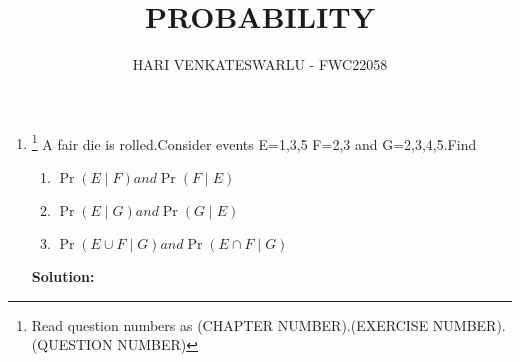 \documentclass{article}
\providecommand{\pr}[1]{\ensuremath{\Pr\left(#1\right)}}
\newcommand{\solution}{\noindent \textbf{Solution: }}
\providecommand{\pr}[1]{\ensuremath{\Pr\left(#1\right)}}
\begin{document}
\title{PROBABILITY}
\author{\Large HARI VENKATESWARLU - FWC22058}
\date{}

\maketitle

\begin{enumerate}[label=13.\arabic{enumi}.\arabic{enumii}]%
\setcounter{enumi}{0}
\setcounter{enumii}{11}

\item \footnote{Read question numbers as (CHAPTER NUMBER).(EXERCISE NUMBER).(QUESTION NUMBER)} {A fair die is rolled.Consider events E=1,3,5 F=2,3 and G=2,3,4,5.Find}
\begin{enumerate}
\item $\pr{E \mid F} and \pr{F \mid E}$
\item $\pr{E \mid G} and \pr{G \mid E}$
\item $\pr{{E \cup F} \mid G} and \pr{{E \cap F} \mid G}$
\end{enumerate}
	\solution\\
	\begin{table}[h]
	
	\caption{}\label{table1:}
\end{table}


\end{enumerate}
\end{document}
